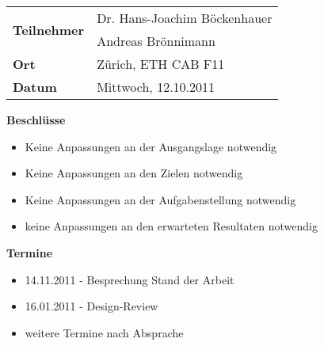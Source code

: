 \documentclass[a4paper]{article}
\begin{document}
\begin{longtable}{p{7cm} p{7cm}}
 \hline
 \multirow{2}{*}{\textbf{Teilnehmer}}  & Dr. Hans-Joachim Böckenhauer \\
         								& Andreas Brönnimann\\
 \hline
	\textbf{Ort} & Zürich, ETH CAB F11\\
 \hline
	\textbf{Datum} & Mittwoch, 12.10.2011\\
\hline
\end{longtable}

\textbf{Beschlüsse}
\begin{itemize}
	\item Keine Anpassungen an der Ausgangslage notwendig
	\item Keine Anpassungen an den Zielen notwendig
	\item Keine Anpassungen an der Aufgabenstellung notwendig
	\item keine Anpassungen an den erwarteten Resultaten notwendig
\end{itemize}

\textbf{Termine}
\begin{itemize}
	\item 14.11.2011 - Besprechung Stand der Arbeit
	\item 16.01.2011 - Design-Review
	\item weitere Termine nach Absprache
\end{itemize}
\end{document}
